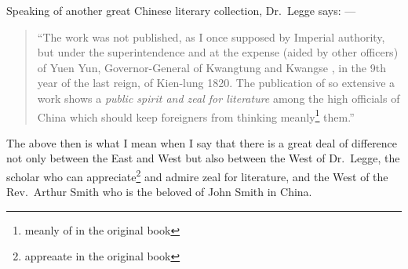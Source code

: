 Speaking of another great Chinese literary collection, Dr.~Legge says: --- 
\begin{quote} \footnotesize
``The work was not published, as I once supposed by Imperial authority, but under the superintendence and at the expense (aided by other officers) of Yuen Yun,  Governor-General of Kwangtung  and Kwangse , in the 9th year of the last reign, of Kien-lung 1820. 
The publication of so extensive a work shows a \emph{public spirit and zeal for literature} among the high officials of China which should keep foreigners from thinking meanly\footnote{meanly of in the original book} them.''
\end{quote}

The above then is what I mean when I say that there is a great deal of difference not only between the East and West but also between the West of Dr.~Legge, the scholar who can appreciate\footnote{appreaate in the original book} and admire zeal for literature, and the West of the Rev.~Arthur Smith who is the beloved of John Smith in China.
